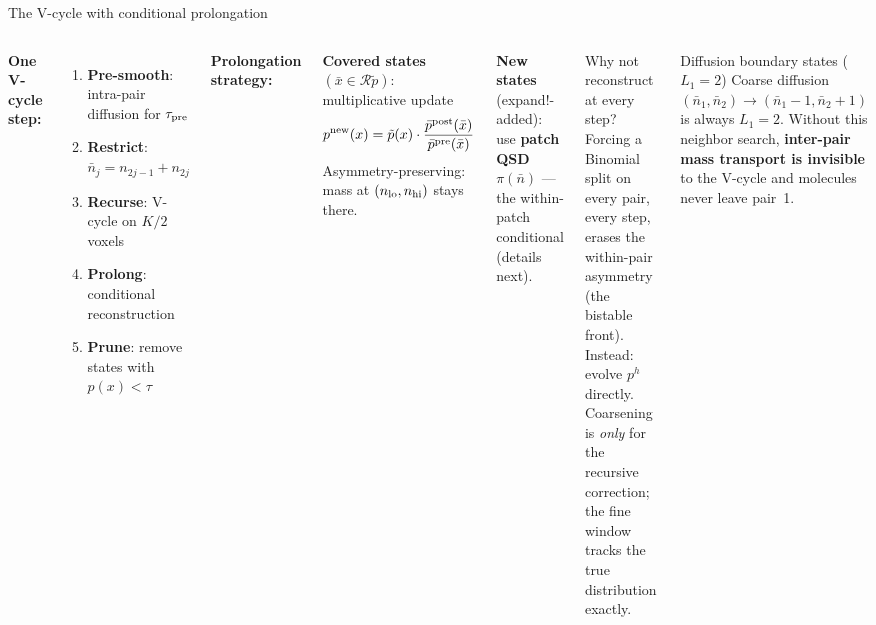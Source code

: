 \documentclass[10pt,aspectratio=169]{beamer}
\newcommand{\calR}{\mathcal{R}}
\begin{document}
\begin{frame}{The V-cycle with conditional prolongation}

\begin{columns}[T]

\textbf{One V-cycle step:}\\[0.3em]
\begin{enumerate}\setlength\itemsep{0.22em}
  \item \textbf{Pre-smooth}: intra-pair diffusion for $\tau_{\rm pre}$
  \item \textbf{Restrict}: $\bar n_j = n_{2j-1}+n_{2j}$
  \item \textbf{Recurse}: V-cycle on $K/2$ voxels
  \item \textbf{Prolong}: conditional reconstruction
  \item \textbf{Prune}: remove states with $p(x) < \tau$
\end{enumerate}

\medskip
\textbf{Prolongation strategy:}

\textbf{Covered states} $(\bar x \in \calR\tilde p)$: multiplicative update
\[
  p^{\rm new}(x) = \tilde p(x)\cdot\frac{\bar p^{\rm post}(\bar x)}{\bar p^{\rm pre}(\bar x)}
\]
Asymmetry-preserving: mass at $(n_{\rm lo},n_{\rm hi})$ stays there.

\textbf{New states} (expand!-added):
use \textbf{patch QSD} $\pi(\bar n)$ --- the within-patch conditional (details next).

\vspace{0.4em}
\begin{block}{Why not reconstruct at every step?}
  Forcing a Binomial split on every pair, every step, erases the
  within-pair asymmetry (the bistable front).\\[0.3em]
  Instead: evolve $p^h$ directly.
  Coarsening is \emph{only} for the recursive correction;
  the fine window tracks the true distribution exactly.
\end{block}

\vspace{0.4em}
\begin{alertblock}{Diffusion boundary states ($L_1{=}2$)}
  Coarse diffusion $({\bar n}_1,{\bar n}_2)\!\to\!({\bar n}_1{-}1,{\bar n}_2{+}1)$
  is always $L_1{=}2$.
  Without this neighbor search, \textbf{inter-pair mass transport is invisible}
  to the V-cycle and molecules never leave pair~1.
\end{alertblock}

\end{columns}

\end{frame}
\end{document}
